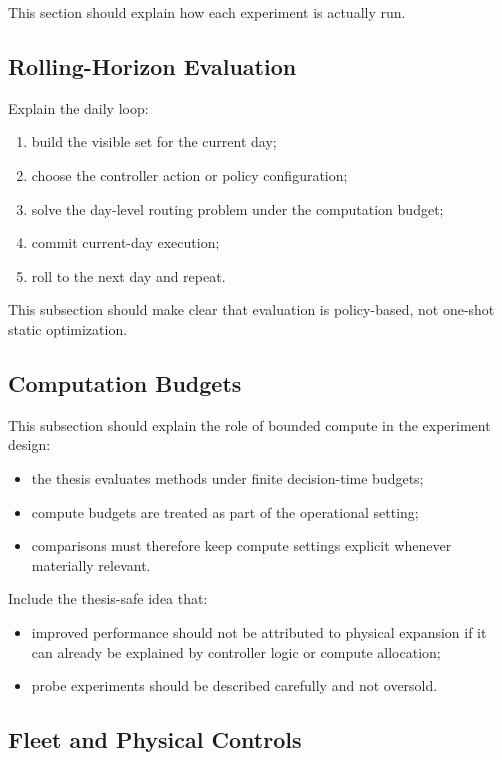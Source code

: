This section should explain how each experiment is actually run.

\subsection{Rolling-Horizon Evaluation}

Explain the daily loop:
\begin{enumerate}
    \item build the visible set for the current day;
    \item choose the controller action or policy configuration;
    \item solve the day-level routing problem under the computation budget;
    \item commit current-day execution;
    \item roll to the next day and repeat.
\end{enumerate}

This subsection should make clear that evaluation is policy-based, not one-shot static optimization.

\subsection{Computation Budgets}

This subsection should explain the role of bounded compute in the experiment design:
\begin{itemize}
    \item the thesis evaluates methods under finite decision-time budgets;
    \item compute budgets are treated as part of the operational setting;
    \item comparisons must therefore keep compute settings explicit whenever materially relevant.
\end{itemize}

\noindent Include the thesis-safe idea that:
\begin{itemize}
    \item improved performance should not be attributed to physical expansion if it can already be explained by controller logic or compute allocation;
    \item probe experiments should be described carefully and not oversold.
\end{itemize}

\subsection{Fleet and Physical Controls}

